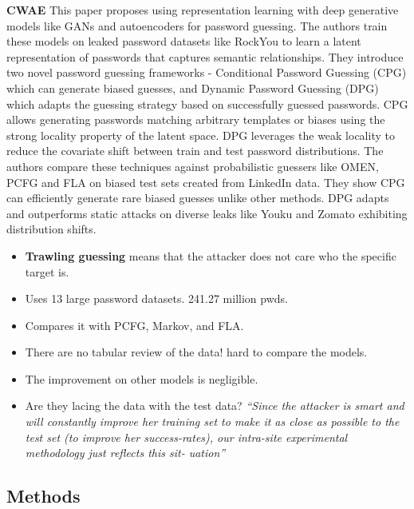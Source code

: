 \textbf{CWAE} \cite{pasquini_improving_2021} This paper
proposes using representation learning with deep generative models like
GANs and autoencoders for password guessing. The authors train these
models on leaked password datasets like RockYou to learn a latent
representation of passwords that captures semantic relationships. They
introduce two novel password guessing frameworks - Conditional Password
Guessing (CPG) which can generate biased guesses, and Dynamic Password
Guessing (DPG) which adapts the guessing strategy based on successfully
guessed passwords. CPG allows generating passwords matching arbitrary
templates or biases using the strong locality property of the latent
space. DPG leverages the weak locality to reduce the covariate shift
between train and test password distributions. The authors compare these
techniques against probabilistic guessers like OMEN, PCFG and FLA on
biased test sets created from LinkedIn data. They show CPG can
efficiently generate rare biased guesses unlike other methods. DPG
adapts and outperforms static attacks on diverse leaks like Youku and
Zomato exhibiting distribution shifts.

\begin{itemize}
\item
  \textbf{Trawling guessing} means that the attacker does not care who
  the specific target is.
\item
  Uses 13 large password datasets. 241.27 million pwds.
\item
  Compares it with PCFG, Markov, and FLA.
\item
  There are no tabular review of the data! hard to compare the models.
\item
  The improvement on other models is negligible.
\item
  Are they lacing the data with the test data? \emph{``Since the
  attacker is smart and will constantly improve her training set to make
  it as close as possible to the test set (to improve her
  success-rates), our intra-site experimental methodology just reflects
  this sit- uation''}
\end{itemize}

\hypertarget{methods}{%
\subsection{Methods}\label{methods}}

